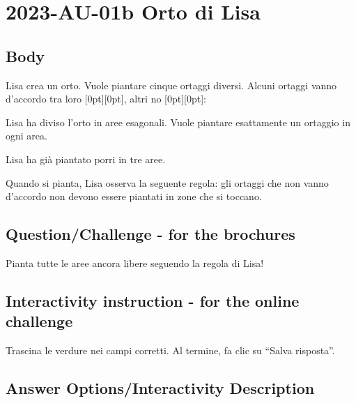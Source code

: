 \documentclass[a4paper,11pt]{report}
\newcommand{\taskGraphicsFolder}{..}
\begin{document}
\section*{\centering{} 2023-AU-01b Orto di Lisa}


\subsection*{Body}

Lisa crea un orto. Vuole piantare cinque ortaggi diversi. Alcuni ortaggi vanno d’accordo tra loro \raisebox{-0.5ex}[0pt][0pt]{}, altri no \raisebox{-0.5ex}[0pt][0pt]{}:

{\centering%
\par}

Lisa ha diviso l’orto in aree esagonali. Vuole piantare esattamente un ortaggio in ogni area.

Lisa ha già piantato porri \raisebox{-0.5ex}{} in tre aree.

{\centering%
\par}

Quando si pianta, Lisa osserva la seguente regola: gli ortaggi che non vanno d’accordo non devono essere piantati in zone che si toccano.

{\em


\subsection*{Question/Challenge - for the brochures}

Pianta tutte le aree ancora libere seguendo la regola di Lisa!

}


\subsection*{Interactivity instruction - for the online challenge}

Trascina le verdure nei campi corretti. Al termine, fa clic su \enquote{Salva risposta}.

\begingroup
\renewcommand{\arraystretch}{1.5}
\subsection*{Answer Options/Interactivity Description}
\end{document}
